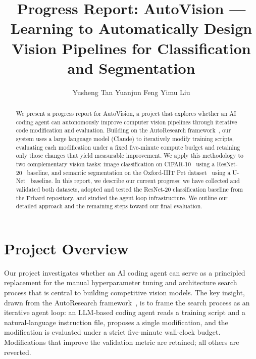 \documentclass[10pt,twocolumn,letterpaper]{article}
\begin{document}
\title{Progress Report: AutoVision --- Learning to Automatically Design Vision Pipelines for Classification and Segmentation}

\author{
Yusheng Tan \hspace{1in} Yuanjun Feng \hspace{1in} Yimu Liu
}
\maketitle

\begin{abstract}
We present a progress report for AutoVision, a project that explores whether an AI coding agent can autonomously improve computer vision pipelines through iterative code modification and evaluation. Building on the AutoResearch framework~\cite{Karpathy2025AutoResearch, Erhard2025AutoResearchCIFAR}, our system uses a large language model (Claude) to iteratively modify training scripts, evaluating each modification under a fixed five-minute compute budget and retaining only those changes that yield measurable improvement. We apply this methodology to two complementary vision tasks: image classification on CIFAR-10~\cite{Krizhevsky2009CIFAR} using a ResNet-20~\cite{He2016ResNet} baseline, and semantic segmentation on the Oxford-IIIT Pet dataset~\cite{Parkhi2012Pets} using a U-Net~\cite{Ronneberger2015UNet} baseline. In this report, we describe our current progress: we have collected and validated both datasets, adopted and tested the ResNet-20 classification baseline from the Erhard repository, and studied the agent loop infrastructure. We outline our detailed approach and the remaining steps toward our final evaluation.
\end{abstract}

\section{Project Overview}

Our project investigates whether an AI coding agent can serve as a principled replacement for the manual hyperparameter tuning and architecture search process that is central to building competitive vision models. The key insight, drawn from the AutoResearch framework~\cite{Karpathy2025AutoResearch}, is to frame the search process as an iterative agent loop: an LLM-based coding agent reads a training script and a natural-language instruction file, proposes a single modification, and the modification is evaluated under a strict five-minute wall-clock budget. Modifications that improve the validation metric are retained; all others are reverted.
\end{document}
